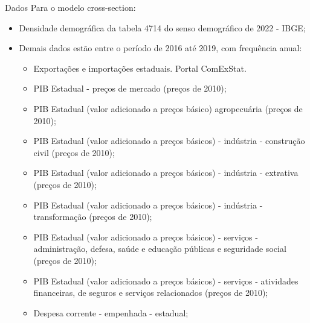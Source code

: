 \documentclass[aspectratio=169, 10pt]{beamer}
\begin{document}
\begin{frame}{Dados}
Para o modelo cross-section:
\begin{itemize}
    \item Densidade demográfica da tabela 4714 do senso demográfico
de 2022 - IBGE;
    \item Demais dados estão entre o período de 2016 até 2019, com frequência anual:
        \begin{itemize}
            \item Exportações e importações estaduais. Portal ComExStat. 
            \item PIB Estadual - preços de mercado (preços de 2010);
            \item PIB Estadual (valor adicionado a preços básico) agropecuária (preços de 2010);
            \item PIB Estadual (valor adicionado a preços básicos) -
indústria - construção civil (preços de 2010);
            \item PIB Estadual (valor adicionado a preços básicos) - indústria - extrativa (preços de 2010); 
            \item PIB Estadual (valor adicionado a preços
básicos) - indústria - transformação (preços de 2010); 
            \item PIB Estadual (valor adicionado a preços básicos) - serviços - administração, defesa, saúde e educação públicas e seguridade social (preços de 2010); 
            \item PIB Estadual (valor adicionado a preços básicos) - serviços - atividades financeiras, de seguros e serviços relacionados (preços de 2010); 
            \item Despesa corrente - empenhada - estadual;
        \end{itemize} 
 \end{itemize}
\end{frame}
\end{document}
